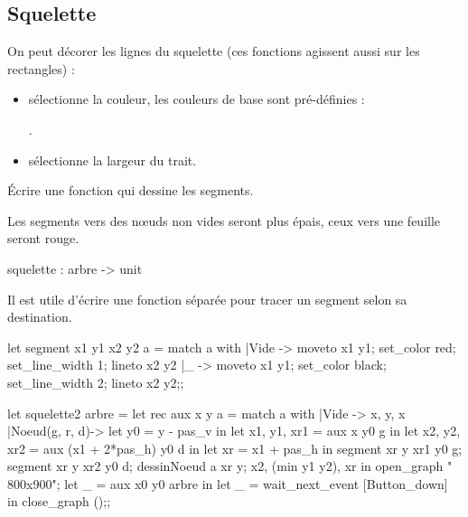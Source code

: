 \subsection{Squelette}
\begin{minipage}{0.5\textwidth}
On peut décorer les lignes du squelette (ces fonctions agissent aussi sur les rectangles) :

\begin{itemize}
  \item {} sélectionne la couleur, les couleurs de base sont pré-définies :
  
 
  .
  \item {} sélectionne la largeur du trait.
\end{itemize}
\begin{question}{}{}
Écrire une fonction  qui dessine les segments.

Les segments vers des nœuds non vides seront plus épais, ceux vers une feuille seront rouge.

\begin{ocaml}
squelette : arbre -> unit
\end{ocaml}

\reponse

Il est utile d'écrire une fonction séparée pour tracer un segment selon sa destination.


\begin{ocaml}
let segment x1 y1 x2 y2 a =
    match a with
    |Vide -> moveto x1 y1;
             set_color red;
             set_line_width 1;
             lineto x2 y2
    |_ -> moveto x1 y1;
          set_color black;
          set_line_width 2;
          lineto x2 y2;;
\end{ocaml}

\begin{ocaml}
let squelette2 arbre =
    let rec aux x y a =
        match a with
        |Vide -> x, y, x
        |Noeud(g, r, d)-> 
                let y0 = y - pas_v in
                let x1, y1, xr1 = aux x y0 g in
                let x2, y2, xr2 = aux (x1 + 2*pas_h) y0 d in
                let xr = x1 + pas_h in
                segment xr y xr1 y0 g;
                segment xr y xr2 y0 d;
                dessinNoeud a xr y;
                x2, (min y1 y2), xr in
    open_graph " 800x900";
    let _ = aux x0 y0 arbre in
    let _ = wait_next_event [Button_down] in  close_graph ();;
\end{ocaml}
\end{question}
\end{minipage}
